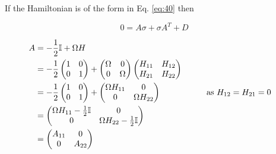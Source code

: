 \documentclass[11pt,a4paper]{article}
\numberwithin{equation}{section}
\begin{document}
	If the Hamiltonian is of the form in Eq. \ref{eq:40} then 
	
	\begin{equation*}
	0 = A\sigma +\sigma A^{T} + D
	\end{equation*} 
	
	\begin{align*}
	A &= -\frac{1}{2}\mathbb{I} + \Omega H&\\
	 &= -\frac{1}{2} \begin{pmatrix}
	 1 & 0  \\
	 0 & 1\\
	 \end{pmatrix} +  \begin{pmatrix}
	 \Omega & 0  \\
	 0 & \Omega\\
	 \end{pmatrix}
	 \begin{pmatrix}
	 H_{11} & H_{12}  \\
	 H_{21} & H_{22}\\
	 \end{pmatrix}&\\
	  &=  -\frac{1}{2} \begin{pmatrix}
	  1 & 0  \\
	  0 & 1\\
	  \end{pmatrix} +  \begin{pmatrix}
	  \Omega H_{11} & 0  \\
	  0 & \Omega H_{22}\\
	  \end{pmatrix}&\tag*{as $H_{12} = H_{21} = 0$}&\\
	  &= \begin{pmatrix}
	  \Omega H_{11} -\frac{1}{2}\mathbb{I} & 0  \\
	  0 & \Omega H_{22}-\frac{1}{2}\mathbb{I}\\
	  \end{pmatrix}&\\
	  &= \begin{pmatrix}
	  A_{11} & 0  \\
	  0 & A_{22}\\
	  \end{pmatrix}&
	\end{align*}
	
\end{document}
